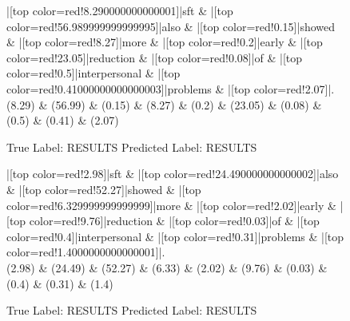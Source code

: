 \documentclass[a4paper, landscape]{article}
\begin{document}
\begin{figure}
\begin{center}
\begin{dependency}
\begin{deptext}
|[top color=red!8.290000000000001]|sft \& |[top color=red!56.989999999999995]|also \& |[top color=red!0.15]|showed \& |[top color=red!8.27]|more \& |[top color=red!0.2]|early \& |[top color=red!23.05]|reduction \& |[top color=red!0.08]|of \& |[top color=red!0.5]|interpersonal \& |[top color=red!0.41000000000000003]|problems \& |[top color=red!2.07]|.\\
(8.29) \& (56.99) \& (0.15) \& (8.27) \& (0.2) \& (23.05) \& (0.08) \& (0.5) \& (0.41) \& (2.07)\\
\end{deptext}
\end{dependency}
\end{center}
\caption{True Label: RESULTS Predicted Label: RESULTS}
\end{figure}
\clearpage
\begin{figure}
\begin{center}
\begin{dependency}
\begin{deptext}
|[top color=red!2.98]|sft \& |[top color=red!24.490000000000002]|also \& |[top color=red!52.27]|showed \& |[top color=red!6.329999999999999]|more \& |[top color=red!2.02]|early \& |[top color=red!9.76]|reduction \& |[top color=red!0.03]|of \& |[top color=red!0.4]|interpersonal \& |[top color=red!0.31]|problems \& |[top color=red!1.4000000000000001]|.\\
(2.98) \& (24.49) \& (52.27) \& (6.33) \& (2.02) \& (9.76) \& (0.03) \& (0.4) \& (0.31) \& (1.4)\\
\end{deptext}
\end{dependency}
\end{center}
\caption{True Label: RESULTS Predicted Label: RESULTS}
\end{figure}
\end{document}
